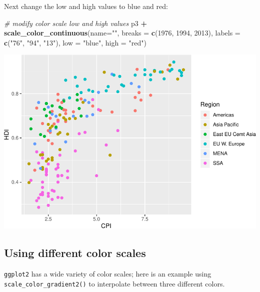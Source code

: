 \documentclass[
]{book}
\newenvironment{Shaded}{\begin{snugshade}}{\end{snugshade}}
\newcommand{\CommentTok}[1]{\textcolor[rgb]{0.56,0.35,0.01}{\textit{#1}}}
\newcommand{\DataTypeTok}[1]{\textcolor[rgb]{0.13,0.29,0.53}{#1}}
\newcommand{\DecValTok}[1]{\textcolor[rgb]{0.00,0.00,0.81}{#1}}
\newcommand{\KeywordTok}[1]{\textcolor[rgb]{0.13,0.29,0.53}{\textbf{#1}}}
\newcommand{\NormalTok}[1]{#1}
\newcommand{\OperatorTok}[1]{\textcolor[rgb]{0.81,0.36,0.00}{\textbf{#1}}}
\newcommand{\StringTok}[1]{\textcolor[rgb]{0.31,0.60,0.02}{#1}}
\begin{document}
Next change the low and high values to blue and red:

\begin{Shaded}
\begin{Highlighting}[]
\CommentTok{\# modify color scale low and high values}
\NormalTok{p3 }\OperatorTok{+}
\StringTok{  }\KeywordTok{scale\_color\_continuous}\NormalTok{(}\DataTypeTok{name=}\StringTok{""}\NormalTok{,}
                         \DataTypeTok{breaks =} \KeywordTok{c}\NormalTok{(}\DecValTok{1976}\NormalTok{, }\DecValTok{1994}\NormalTok{, }\DecValTok{2013}\NormalTok{),}
                         \DataTypeTok{labels =} \KeywordTok{c}\NormalTok{(}\StringTok{"\textquotesingle{}76"}\NormalTok{, }\StringTok{"\textquotesingle{}94"}\NormalTok{, }\StringTok{"\textquotesingle{}13"}\NormalTok{),}
                         \DataTypeTok{low =} \StringTok{"blue"}\NormalTok{, }\DataTypeTok{high =} \StringTok{"red"}\NormalTok{)}
\end{Highlighting}
\end{Shaded}

\includegraphics{R/Rgraphics/figures/unnamed-chunk-200-1.pdf}

\hypertarget{using-different-color-scales}{%
\subsection{Using different color scales}\label{using-different-color-scales}}

\texttt{ggplot2} has a wide variety of color scales; here is an example using \texttt{scale\_color\_gradient2()} to interpolate between three different colors.
\end{document}
